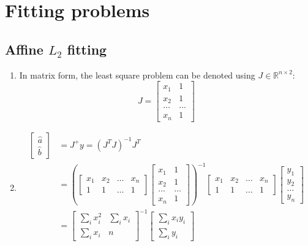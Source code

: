 \documentclass[oneside, a4paper]{book}
\newcommand\br[1]{\left(#1\right)}
\begin{document}
\chapter{Fitting problems}
\section{Affine $L_2$ fitting}
\begin{enumerate}
  \item In matrix form, the least square problem can be denoted using $J\in\mathds{R}^{n\times 2}$: \[ J = \begin{bmatrix}
    x_1&1\\
    x_2&1\\
    \dots&\dots\\
    x_n&1
  \end{bmatrix} \]
  \item \begin{align*}
    \begin{bmatrix}\hat{a}\\\hat{b}\end{bmatrix} &= J^+ y = (J^T J)^{-1} J^T\\
    &= \br{
      \begin{bmatrix}x_1&x_2&\dots&x_n\\  1 & 1 & \dots & 1\end{bmatrix} 
      \begin{bmatrix}x_1&1\\x_2&1\\\dots&\dots\\x_n&1\end{bmatrix}
    }^{-1} 
    \begin{bmatrix}x_1&x_2&\dots&x_n\\  1 & 1 & \dots & 1\end{bmatrix} 
    \begin{bmatrix}y_1\\y_2\\\dots\\y_n\end{bmatrix}
    \\
    &= \begin{bmatrix}
      \sum_i x_i^2 & \sum_i x_i \\
      \sum_i x_i & n
    \end{bmatrix}^{-1}
    \begin{bmatrix}\sum_i x_i y_i\\ \sum_i y_i\end{bmatrix} 
    \\

\end{align*}
\end{enumerate}
\end{document}
